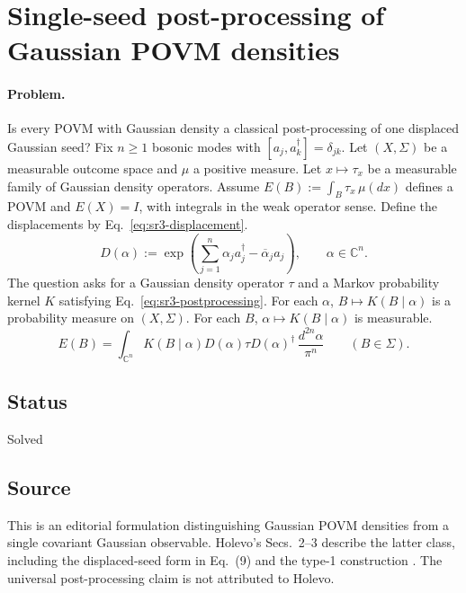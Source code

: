 \section{Single-seed post-processing of Gaussian POVM densities}
\label{sec:op_8bb2af22f3465748}

\paragraph{Problem.}
Is every POVM with Gaussian density a classical post-processing of one displaced Gaussian seed?
Fix $n\geq1$ bosonic modes with $[a_j,a_k^\dagger]=\delta_{jk}$.
Let $(X,\Sigma)$ be a measurable outcome space and $\mu$ a positive measure.
Let $x\mapsto\tau_x$ be a measurable family of Gaussian density operators.
Assume $E(B):=\int_B\tau_x\,\mu(dx)$ defines a POVM and $E(X)=I$, with integrals in the weak operator sense.
Define the displacements by Eq.~\eqref{eq:sr3-displacement}.
\begin{equation}
D(\alpha):=\exp\!\left(\sum_{j=1}^n\alpha_j a_j^\dagger-\overline\alpha_j a_j\right),\qquad \alpha\in\mathbb C^n.
\label{eq:sr3-displacement}
\end{equation}
The question asks for a Gaussian density operator $\tau$ and a Markov probability kernel $K$ satisfying Eq.~\eqref{eq:sr3-postprocessing}.
For each $\alpha$, $B\mapsto K(B\mid\alpha)$ is a probability measure on $(X,\Sigma)$.
For each $B$, $\alpha\mapsto K(B\mid\alpha)$ is measurable.
\begin{equation}
E(B)=\int_{\mathbb C^n}K(B\mid\alpha)D(\alpha)\tau D(\alpha)^\dagger\,\frac{d^{2n}\alpha}{\pi^n}\qquad(B\in\Sigma).
\label{eq:sr3-postprocessing}
\end{equation}

\subsection*{Status}

Solved

\subsection*{Source}

This is an editorial formulation distinguishing Gaussian POVM densities from a single covariant Gaussian observable. Holevo's Secs.~2--3 describe the latter class, including the displaced-seed form in Eq.~(9) and the type-1 construction . The universal post-processing claim is not attributed to Holevo.

